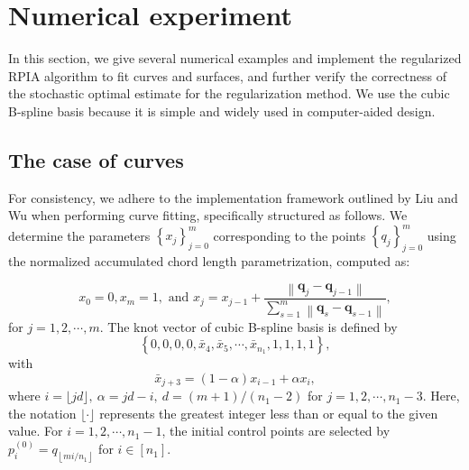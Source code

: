 \documentclass[11pt]{article}
\numberwithin{equation}{section}
\begin{document}
\section{Numerical experiment}
In this section, we give several numerical examples and implement the regularized RPIA algorithm to fit curves and surfaces, and further verify the correctness of the stochastic optimal estimate for the regularization method. We use the cubic B-spline basis because it is simple and widely used in computer-aided design\cite{DENG201432,EBRAHIMI20191,HUANG2020101931,ZHU2024113436}.

\subsection{The case of curves}\label{section7.1}

For consistency, we adhere to the implementation framework outlined by Liu and Wu\cite{WU2024128669} when performing curve fitting, specifically structured as follows. We determine the parameters $\left\{x_j\right\}_{j=0}^m$ corresponding to the points $\left\{q_j\right\}_{j=0}^m$ using the normalized accumulated chord length parametrization, computed as:

$$
x_0=0, x_m=1, \text { and } x_j=x_{j-1}+\frac{\left\|\boldsymbol{q}_j-\boldsymbol{q}_{j-1}\right\|}{\sum_{s=1}^m\left\|\boldsymbol{q}_s-\boldsymbol{q}_{s-1}\right\|},
$$
for $j=1,2, \cdots, m$. The knot vector of cubic B-spline basis is defined by
$$
\left\{0,0,0,0, \bar{x}_4, \bar{x}_5, \cdots, \bar{x}_{n_1}, 1,1,1,1\right\},
$$
with
$$
\bar{x}_{j+3}=(1-\alpha) x_{i-1}+\alpha x_i,
$$
where $i=\lfloor j d\rfloor, ~\alpha=j d-i, ~d=(m+1) /\left(n_1-2\right)$ for $j=1,2, \cdots, n_1-3$. Here, the notation $\lfloor\cdot\rfloor$ represents the greatest integer less than or equal to the given value. For $i=1,2, \cdots, n_1-1$, the initial control points are selected by $p_i^{(0)}=q_{\left\lfloor m i / n_1\right\rfloor}$ for $i \in\left[n_1\right]$. 
\end{document}
